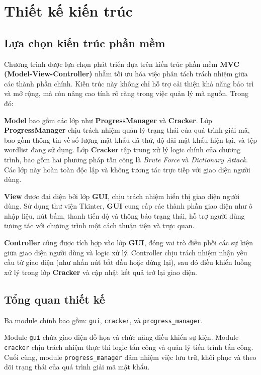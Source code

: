 \documentclass[../DoAn.tex]{subfiles}
\begin{document}
\section{Thiết kế kiến trúc}
\subsection{Lựa chọn kiến trúc phần mềm}
Chương trình được lựa chọn phát triển dựa trên kiến trúc phần mềm \textbf{MVC (Model-View-Controller)} nhằm tối ưu hóa việc phân tách trách nhiệm giữa các thành phần chính. Kiến trúc này không chỉ hỗ trợ cải thiện khả năng bảo trì và mở rộng, mà còn nâng cao tính rõ ràng trong việc quản lý mã nguồn. Trong đó: 

\textbf{Model} bao gồm các lớp như \textbf{ProgressManager} và \textbf{Cracker}. Lớp \textbf{ProgressManager} chịu trách nhiệm quản lý trạng thái của quá trình giải mã, bao gồm thông tin về số lượng mật khẩu đã thử, độ dài mật khẩu hiện tại, và tệp wordlist đang sử dụng. Lớp \textbf{Cracker} tập trung xử lý logic chính của chương trình, bao gồm hai phương pháp tấn công là \textit{Brute Force} và \textit{Dictionary Attack}. Các lớp này hoàn toàn độc lập và không tương tác trực tiếp với giao diện người dùng.

\textbf{View} được đại diện bởi lớp \textbf{GUI}, chịu trách nhiệm hiển thị giao diện người dùng. Sử dụng thư viện Tkinter, \textbf{GUI} cung cấp các thành phần giao diện như ô nhập liệu, nút bấm, thanh tiến độ và thông báo trạng thái, hỗ trợ người dùng tương tác với chương trình một cách thuận tiện và trực quan.

\textbf{Controller} cũng được tích hợp vào lớp \textbf{GUI}, đóng vai trò điều phối các sự kiện giữa giao diện người dùng và logic xử lý. Controller chịu trách nhiệm nhận yêu cầu từ giao diện (như nhấn nút bắt đầu hoặc dừng lại), sau đó điều khiển luồng xử lý trong lớp \textbf{Cracker} và cập nhật kết quả trở lại giao diện. 

\subsection{Tổng quan thiết kế}

Ba module chính bao gồm: \verb|gui|, \verb|cracker|, và \verb|progress_manager|. 

Module \verb|gui| chứa giao diện đồ họa và chức năng điều khiển sự kiện. Module \verb|cracker| chịu trách nhiệm thực thi logic tấn công và quản lý tiến trình tấn công. Cuối cùng, module \verb|progress_manager| đảm nhiệm việc lưu trữ, khôi phục và theo dõi trạng thái của quá trình giải mã mật khẩu. 
\end{document}
